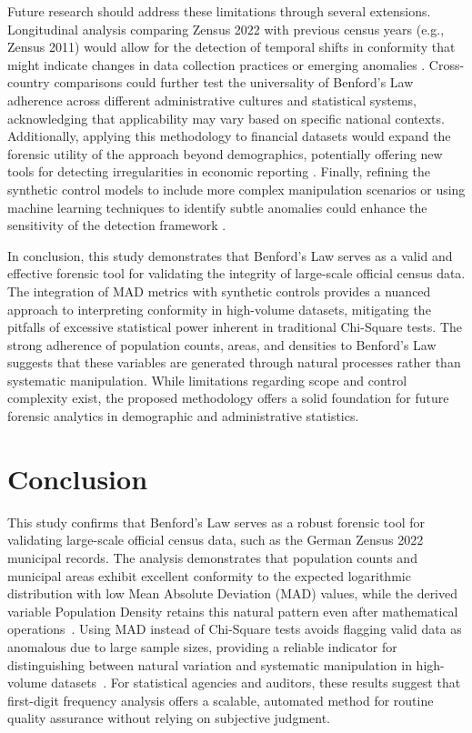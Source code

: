 \documentclass[11pt,a4paper]{article}
\begin{document}
Future research should address these limitations through several extensions. Longitudinal analysis comparing Zensus 2022 with previous census years (e.g., Zensus 2011) would allow for the detection of temporal shifts in conformity that might indicate changes in data collection practices or emerging anomalies \cite{Druica2018BenfordsLA}. Cross-country comparisons could further test the universality of Benford's Law adherence across different administrative cultures and statistical systems, acknowledging that applicability may vary based on specific national contexts. Additionally, applying this methodology to financial datasets would expand the forensic utility of the approach beyond demographics, potentially offering new tools for detecting irregularities in economic reporting \cite{Jianu2021ReliabilityOF}. Finally, refining the synthetic control models to include more complex manipulation scenarios or using machine learning techniques to identify subtle anomalies could enhance the sensitivity of the detection framework \cite{Wiryadinata2023TheUO}.

In conclusion, this study demonstrates that Benford's Law serves as a valid and effective forensic tool for validating the integrity of large-scale official census data. The integration of MAD metrics with synthetic controls provides a nuanced approach to interpreting conformity in high-volume datasets, mitigating the pitfalls of excessive statistical power inherent in traditional Chi-Square tests. The strong adherence of population counts, areas, and densities to Benford's Law suggests that these variables are generated through natural processes rather than systematic manipulation. While limitations regarding scope and control complexity exist, the proposed methodology offers a solid foundation for future forensic analytics in demographic and administrative statistics.

\section{Conclusion}
This study confirms that Benford's Law serves as a robust forensic tool for validating large-scale official census data, such as the German Zensus 2022 municipal records. The analysis demonstrates that population counts and municipal areas exhibit excellent conformity to the expected logarithmic distribution with low Mean Absolute Deviation (MAD) values, while the derived variable Population Density retains this natural pattern even after mathematical operations~\cite{Azevedo2021ABL}. Using MAD instead of Chi-Square tests avoids flagging valid data as anomalous due to large sample sizes, providing a reliable indicator for distinguishing between natural variation and systematic manipulation in high-volume datasets~\cite{Cole2019TestingTE}. For statistical agencies and auditors, these results suggest that first-digit frequency analysis offers a scalable, automated method for routine quality assurance without relying on subjective judgment.



\printbibliography
\end{document}
